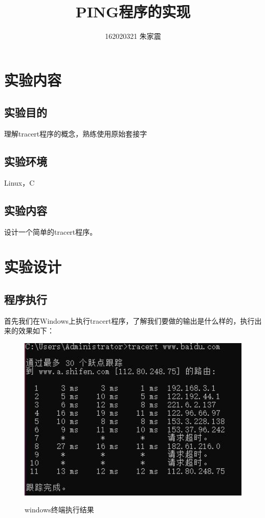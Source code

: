 \documentclass[12pt]{ctexart}
\title{PING程序的实现}
\author{162020321 朱家震}
\begin{document}
    \maketitle
    \setcounter{section}{0}
    \section{实验内容}
    \subsection{实验目的}

    理解tracert程序的概念，熟练使用原始套接字

    \subsection{实验环境}

    Linux，C

    \subsection{实验内容}

    设计一个简单的tracert程序。

    \section{实验设计}
    \subsection{程序执行}

    首先我们在Windows上执行tracert程序，了解我们要做的输出是什么样的，执行出来的效果如下：
    
    \begin{figure}[H]
        \centering
        \includegraphics[width=5in]{figures/cmd.jpg}
        \label{sw}
        \caption{windows终端执行结果}
    \end{figure}
\end{document}
